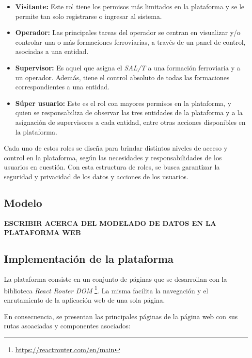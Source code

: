 \begin{itemize}

  \item \textbf{Visitante:} Este rol tiene los permisos más limitados en la plataforma y se le permite tan solo registrarse o ingresar al sistema.

  \item \textbf{Operador:} Las principales tareas del operador se centran en visualizar y/o controlar una o más formaciones ferroviarias, a través de un panel de control, asociadas a una entidad.

  \item \textbf{Supervisor:} Es aquel que asigna el \textit{SAL/T} a una formación ferroviaria y a un operador. Además, tiene el control absoluto de todas las formaciones correspondientes a una entidad.

  \item \textbf{Súper usuario:} Este es el rol con mayores permisos en la plataforma, y quien se responsabiliza de observar las tres entidades de la plataforma y a la asignación de supervisores a cada entidad, entre otras acciones disponibles en la plataforma.

\end{itemize}

Cada uno de estos roles se diseña para brindar distintos niveles de acceso y control en la plataforma, según las necesidades y responsabilidades de los usuarios en cuestión. Con esta estructura de roles, se busca garantizar la seguridad y privacidad de los datos y acciones de los usuarios.


\subsection{Modelo}


\textbf{ESCRIBIR ACERCA DEL MODELADO DE DATOS EN LA PLATAFORMA WEB}


\subsection{Implementación de la plataforma}

La plataforma consiste en un conjunto de páginas que se desarrollan con la biblioteca \textit{React Router DOM} \footnote{\url{https://reactrouter.com/en/main}}. La misma facilita la navegación y el enrutamiento de la aplicación web de una sola página.

En consecuencia, se presentan las principales páginas de la página web con sus rutas asoaciadas y componentes asociados:



